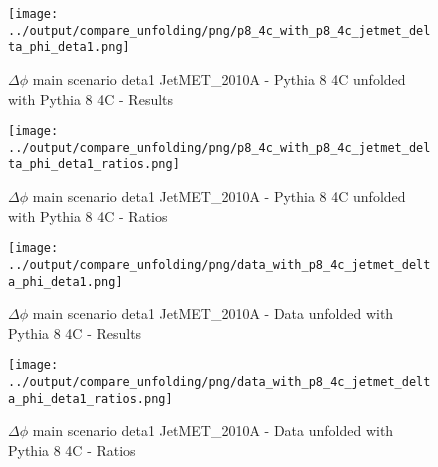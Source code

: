 \documentclass[11pt]{book}
\begin{document}
\begin{figure}[ht]
\centering
\texttt{[image: ../output/compare\_unfolding/png/p8\_4c\_with\_p8\_4c\_jetmet\_delta\_phi\_deta1.png]}
\caption{$\Delta\phi$ main scenario deta1 JetMET\_2010A - Pythia 8 4C unfolded with Pythia 8 4C - Results}
\label{p8_p8_jetmet_delta_phi_deta1_a}
\end{figure}

\begin{figure}[ht]
\centering
\texttt{[image: ../output/compare\_unfolding/png/p8\_4c\_with\_p8\_4c\_jetmet\_delta\_phi\_deta1\_ratios.png]}
\caption{$\Delta\phi$ main scenario deta1 JetMET\_2010A - Pythia 8 4C unfolded with Pythia 8 4C - Ratios}
\label{p8_p8_jetmet_delta_phi_deta1_b}
\end{figure}

\begin{comment}
\begin{figure}[ht]
\centering
\texttt{[image: ../output/compare\_unfolding/png/p6\_z2\_with\_p8\_4c\_jetmet\_delta\_phi\_deta1.png]}
\caption{$\Delta\phi$ main scenario deta1 JetMET\_2010A - Pythia 6 Z2* unfolded with Pythia 8 4C - Results}
\label{p6_p8_jetmet_delta_phi_deta1_a}
\end{figure}

\begin{figure}[ht]
\centering
\texttt{[image: ../output/compare\_unfolding/png/p6\_z2\_with\_p8\_4c\_jetmet\_delta\_phi\_deta1\_ratios.png]}
\caption{$\Delta\phi$ main scenario deta1 JetMET\_2010A - Pythia 6 Z2* unfolded with Pythia 8 4C - Ratios}
\label{p6_p8_jetmet_delta_phi_deta1_b}
\end{figure}

\end{comment}


\begin{figure}[ht]
\centering
\texttt{[image: ../output/compare\_unfolding/png/data\_with\_p8\_4c\_jetmet\_delta\_phi\_deta1.png]}
\caption{$\Delta\phi$ main scenario deta1 JetMET\_2010A - Data unfolded with Pythia 8 4C - Results}
\label{data_p8_jetmet_delta_phi_deta1_a}
\end{figure}

\begin{figure}[ht]
\centering
\texttt{[image: ../output/compare\_unfolding/png/data\_with\_p8\_4c\_jetmet\_delta\_phi\_deta1\_ratios.png]}
\caption{$\Delta\phi$ main scenario deta1 JetMET\_2010A - Data unfolded with Pythia 8 4C - Ratios}
\label{data_p8_jetmet_delta_phi_deta1_b}
\end{figure}
\end{document}
